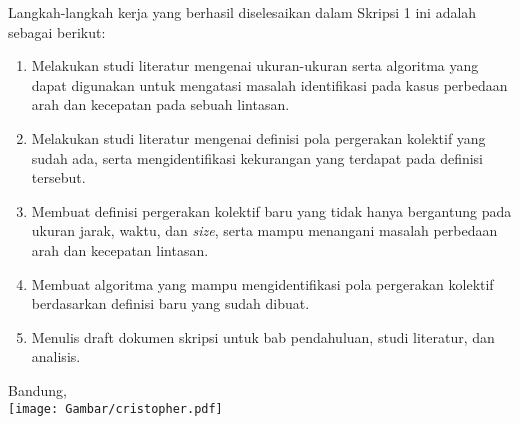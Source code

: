 \documentclass[a4paper,twoside]{article}
\begin{document}
Langkah-langkah kerja yang berhasil diselesaikan dalam Skripsi 1 ini adalah sebagai berikut:

\begin{enumerate}
    \item Melakukan studi literatur mengenai ukuran-ukuran serta algoritma yang dapat digunakan untuk mengatasi masalah identifikasi pada kasus perbedaan arah dan kecepatan pada sebuah lintasan.
    \item Melakukan studi literatur mengenai definisi pola pergerakan kolektif yang sudah ada, serta mengidentifikasi kekurangan yang terdapat pada definisi tersebut.
    \item Membuat definisi pergerakan kolektif baru yang tidak hanya bergantung pada ukuran jarak, waktu, dan \textit{size}, serta mampu menangani masalah perbedaan arah dan kecepatan lintasan.
    \item Membuat algoritma yang mampu mengidentifikasi pola pergerakan kolektif berdasarkan definisi baru yang sudah dibuat.
    \item Menulis draft dokumen skripsi untuk bab pendahuluan, studi literatur, dan analisis.
\end{enumerate}

\iffalse 

\section{Kendala yang Dihadapi}
Kendala - kendala yang dihadapi selama mengerjakan skripsi :
\begin{itemize}
	\item Terlalu banyak melakukan prokrastinasi
	\item Terlalu banyak godaan berupa hiburan (game, film, dll)
	\item Koneksi internet yang kurang stabil sehingga sering menyebabkan koneksi ke Overleaf terputus yang menyebabkan beberapa usaha terbuang sia-sia
\end{itemize}

\fi

\vspace{1cm}
\centering Bandung, \tanggal\\
\vspace{0.5cm}
\texttt{[image: Gambar/cristopher.pdf]} \\
\nama \\ 
\vspace{1cm}
\end{document}
